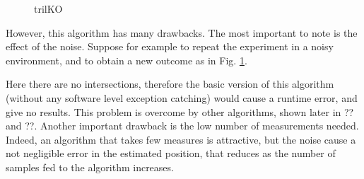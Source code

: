 \documentclass[12pt]{report}
\begin{document}
\begin{figure}
\centering
{}
\caption{trilKO} \label{fig:trilKO}
\end{figure}

However, this algorithm has many drawbacks. The most important to note is the effect of the noise. Suppose for example to repeat the experiment in a noisy environment, and to obtain a new outcome as in Fig. \ref{fig:trilKO}.

Here there are no intersections, therefore the basic version of this algorithm (without any software level exception catching) would cause a runtime error, and give no results. This problem is overcome by other algorithms, shown later in ?? and ??. Another important drawback is the low number of measurements needed. Indeed, an algorithm that takes few measures is attractive, but the noise cause a not negligible error in the estimated position, that reduces as the number of samples fed to the algorithm increases.
\clearpage
\end{document}
